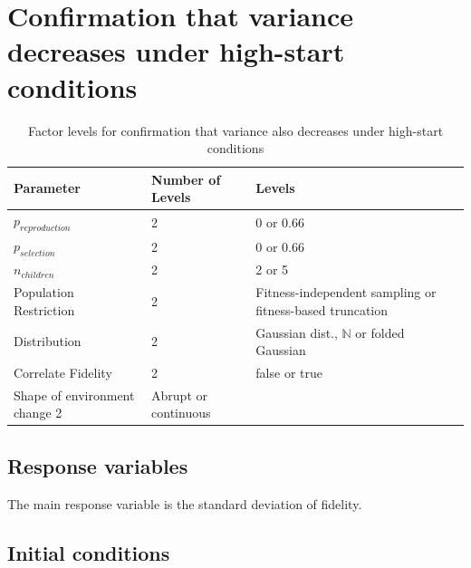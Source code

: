 \section{Confirmation that variance decreases under high-start conditions}




\begin{table} %
	\begin{center}
		\caption{Factor levels for confirmation that variance also decreases under high-start conditions}
		\label{Factor-levels-for-investigation-into-variance-under-high-start-conditions}
		\begin{tabular}{@{}llp{6cm}@{}}
			\toprule
			Parameter              & Number of Levels & Levels                                                   \\
			\midrule
			$p_{reproduction}$     & 2                & 0 or 0.66                                                \\
			$p_{selection}$        & 2                & 0 or 0.66                                                \\
			$n_{children}$         & 2                & 2 or 5                                                   \\
			Population Restriction & 2                & Fitness-independent sampling or fitness-based truncation \\
			Distribution           & 2                & Gaussian dist., $\mathbb{N}$ or folded Gaussian          \\
			Correlate Fidelity     & 2                & false or true                                            \\
			Shape of environment change		2&	Abrupt or continuous\\
			\bottomrule
		\end{tabular}
	\end{center}
\end{table}

\subsection{Response variables}

The main response variable is the standard deviation of fidelity.

\subsection{Initial conditions}

